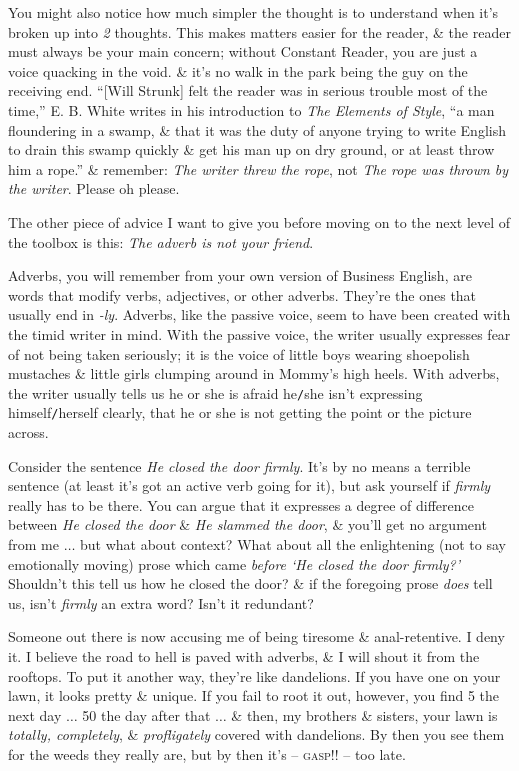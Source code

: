 \documentclass{article}
\numberwithin{equation}{section}
\begin{document}
You might also notice how much simpler the thought is to understand when it's broken up into \textit{2} thoughts. This makes matters easier for the reader, \& the reader must always be your main concern; without Constant Reader, you are just a voice quacking in the void. \& it's no walk in the park being the guy on the receiving end. ``[Will Strunk] felt the reader was in serious trouble most of the time,'' E. B. White writes in his introduction to \textit{The Elements of Style}, ``a man floundering in a swamp, \& that it was the duty of anyone trying to write English to drain this swamp quickly \& get his man up on dry ground, or at least throw him a rope.'' \& remember: \textit{The writer threw the rope}, not \textit{The rope was thrown by the writer}. Please oh please.

The other piece of advice I want to give you before moving on to the next level of the toolbox is this: \textit{The adverb is not your friend}.

Adverbs, you will remember from your own version of Business English, are words that modify verbs, adjectives, or other adverbs. They're the ones that usually end in \textit{-ly}. Adverbs, like the passive voice, seem to have been created with the timid writer in mind. With the passive voice, the writer usually expresses fear of not being taken seriously; it is the voice of little boys wearing shoepolish mustaches \& little girls clumping around in Mommy's high heels. With adverbs, the writer usually tells us he or she is afraid he{\tt/}she isn't expressing himself{\tt/}herself clearly, that he or she is not getting the point or the picture across.

Consider the sentence \textit{He closed the door firmly}. It's by no means a terrible sentence (at least it's got an active verb going for it), but ask yourself if \textit{firmly} really has to be there. You can argue that it expresses a degree of difference between \textit{He closed the door} \& \textit{He slammed the door}, \& you'll get no argument from me $\ldots$ but what about context? What about all the enlightening (not to say emotionally moving) prose which came \textit{before `He closed the door firmly?'} Shouldn't this tell us how he closed the door? \& if the foregoing prose \textit{does} tell us, isn't \textit{firmly} an extra word? Isn't it redundant?

Someone out there is now accusing me of being tiresome \& anal-retentive. I deny it. I believe the road to hell is paved with adverbs, \& I will shout it from the rooftops. To put it another way, they're like dandelions. If you have one on your lawn, it looks pretty \& unique. If you fail to root it out, however, you find 5 the next day $\ldots$ 50 the day after that $\ldots$ \& then, my brothers \& sisters, your lawn is \textit{totally, completely}, \& \textit{profligately} covered with dandelions. By then you see them for the weeds they really are, but by then it's -- \textsc{gasp}!! -- too late.
\end{document}
